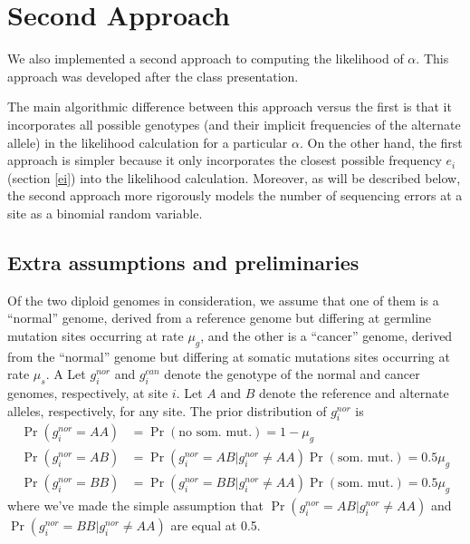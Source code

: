 \documentclass[12pt]{article}
\begin{document}
\section{Second Approach}
\label{sec:second-approach}
We also implemented a second approach to computing the likelihood of
$\alpha$.  This approach was developed after the class presentation.

The main algorithmic difference between this approach versus the first
is that it incorporates all possible genotypes (and their implicit
frequencies of the alternate allele) in the likelihood calculation for
a particular $\alpha$.  On the other hand, the first approach is
simpler because it only incorporates the closest possible frequency
$e_i$ (section \ref{ei}) into the likelihood calculation.  Moreover,
as will be described below, the second approach more rigorously models
the number of sequencing errors at a site as a binomial random
variable.

\subsection{Extra assumptions and preliminaries}
Of the two diploid genomes in consideration, we assume that one of
them is a ``normal'' genome, derived from a reference genome but
differing at germline mutation sites occurring at rate $\mu_g$, and the
other is a ``cancer'' genome, derived from the ``normal'' genome but
differing at somatic mutations sites occurring at rate $\mu_s$.  A Let
$g_i^{nor}$ and $g_i^{can}$ denote the genotype of the normal and
cancer genomes, respectively, at site $i$.  Let $A$ and $B$ denote the
reference and alternate alleles, respectively, for any site.  The
prior distribution of $g_i^{nor}$ is
\begin{align*}
\Pr(g_i^{nor}=AA) &= \Pr(\text{no som. mut.}) = 1 - \mu_g \\
\Pr(g_i^{nor}=AB) &= \Pr(g_i^{nor}=AB | g_i^{nor} \not= AA)\Pr(\text{som. mut.}) = 0.5 \mu_g \\
\Pr(g_i^{nor}=BB) &= \Pr(g_i^{nor}=BB | g_i^{nor} \not= AA)\Pr(\text{som. mut.}) = 0.5 \mu_g
\end{align*}
where we've made the simple assumption that $\Pr(g_i^{nor}=AB |
g_i^{nor} \not = AA)$ and $\Pr(g_i^{nor}=BB | g_i^{nor} \not = AA)$
  are equal at 0.5.  
\end{document}
